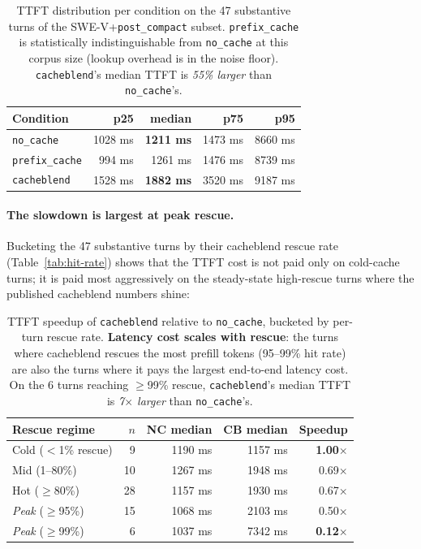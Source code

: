 \begin{table}[h]
\small
\centering
\begin{tabular}{lrrrr}
\toprule
Condition & p25 & median & p75 & p95 \\
\midrule
\texttt{no\_cache}      & 1028 ms & \textbf{1211 ms} & 1473 ms & 8660 ms \\
\texttt{prefix\_cache}  & 994 ms  & 1261 ms          & 1476 ms & 8739 ms \\
\texttt{cacheblend}     & 1528 ms & \textbf{1882 ms} & 3520 ms & 9187 ms \\
\bottomrule
\end{tabular}
\caption{TTFT distribution per condition on the 47 substantive turns
of the SWE-V+\texttt{post\_compact} subset. \texttt{prefix\_cache} is statistically
indistinguishable from \texttt{no\_cache} at this corpus size (lookup
overhead is in the noise floor). \texttt{cacheblend}'s median TTFT
is \emph{55\% larger} than \texttt{no\_cache}'s.}
\label{tab:ttft}
\end{table}

\paragraph{The slowdown is largest at peak rescue.} Bucketing the 47
substantive turns by their cacheblend rescue rate
(Table~\ref{tab:hit-rate}) shows that the TTFT cost is not paid only on
cold-cache turns; it is paid most aggressively on the steady-state
high-rescue turns where the published cacheblend numbers shine:

\begin{table}[h]
\small
\centering
\begin{tabular}{lrrrr}
\toprule
Rescue regime & $n$ & NC median & CB median & Speedup \\
\midrule
Cold ($<$1\% rescue)         & 9  & 1190 ms & 1157 ms & \textbf{1.00$\times$} \\
Mid (1--80\%)                & 10 & 1267 ms & 1948 ms & 0.69$\times$ \\
Hot ($\geq$80\%)             & 28 & 1157 ms & 1930 ms & 0.67$\times$ \\
\midrule
\emph{Peak} ($\geq$95\%)     & 15 & 1068 ms & 2103 ms & 0.50$\times$ \\
\emph{Peak} ($\geq$99\%)     & 6  & 1037 ms & 7342 ms & \textbf{0.12$\times$} \\
\bottomrule
\end{tabular}
\caption{TTFT speedup of \texttt{cacheblend} relative to
\texttt{no\_cache}, bucketed by per-turn rescue rate.
\textbf{Latency cost scales with rescue}: the turns where cacheblend
rescues the most prefill tokens (95--99\% hit rate) are also the
turns where it pays the largest end-to-end latency cost. On the 6 turns reaching $\geq$99\% rescue,
\texttt{cacheblend}'s median TTFT is \emph{7$\times$ larger} than
\texttt{no\_cache}'s.}
\label{tab:ttft-by-rescue}
\end{table}

